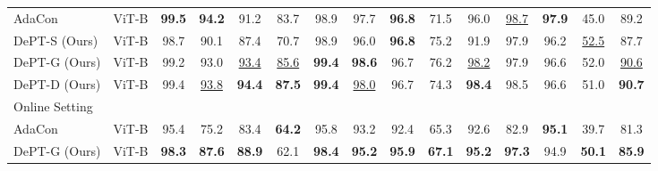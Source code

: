 \documentclass{article} \usepackage{iclr2023_conference,times}
\begin{document}
\begin{table}[h]
\begin{center}
{\begin{tabular}{l|c|cccccccccccc|c}
AdaCon & ViT-B & \bf 99.5 & \bf 94.2 & 91.2 & 83.7 & 98.9 & 97.7 & \bf 96.8 & 71.5 & 96.0 & \underline{98.7} & \bf 97.9 & 45.0 & 89.2\\
DePT-S (Ours) & ViT-B & 98.7 & 90.1 & 87.4 & 70.7 & 98.9 & 96.0 & \bf 96.8 & 75.2 & 91.9 & 97.9 & 96.2 & \underline{52.5} & 87.7\\
DePT-G (Ours) & ViT-B & 99.2 & 93.0 & \underline{93.4} & \underline{85.6} & \bf 99.4 & \bf 98.6 & 96.7 & 76.2 & \underline{98.2} & 97.9 & 96.6 & 52.0 & \underline{90.6}\\
DePT-D (Ours)& ViT-B & 99.4 & \underline{93.8} & \bf 94.4 & \bf 87.5 & \bf 99.4 & \underline{98.0} & 96.7 & 74.3 & \bf 98.4 & 98.5 & 96.6 & 51.0 & \bf 90.7\\
\midrule \hline
\multicolumn{15}{l}{Online Setting}   \\ \hline
AdaCon & ViT-B & 95.4 & 75.2 & 83.4 & \textbf{64.2} & 95.8 & 93.2 & 92.4 & 65.3 & 92.6 & 82.9 & \textbf{95.1} & 39.7 & 81.3 \\
DePT-G (Ours) & ViT-B & \textbf{98.3} & \textbf{87.6} & \textbf{88.9} & 62.1 & \textbf{98.4} & \textbf{95.2} & \textbf{95.9} & \textbf{67.1} & \textbf{95.2} & \textbf{97.3} & 94.9 & \textbf{50.1} & \textbf{85.9}\\ \bottomrule


\end{tabular}}
\end{center}
\end{table}
\end{document}
